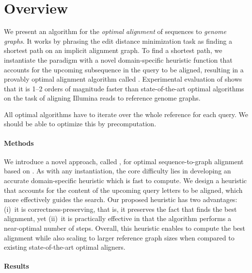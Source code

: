 \section{Overview}

We present an algorithm for the \emph{optimal alignment} of sequences to
\emph{genome graphs}. It works by phrasing the edit distance minimization task
as finding a shortest path on an implicit alignment graph. To find a shortest
path, we instantiate the \A paradigm with a novel domain-specific heuristic
function that accounts for the upcoming subsequence in the query to be aligned,
resulting in a provably optimal alignment algorithm called \astarix.
Experimental evaluation of \astarix shows that it is 1--2 orders of magnitude
faster than state-of-the-art optimal algorithms on the task of aligning Illumina
reads to reference genome graphs.

All optimal algorithms have to iterate over the whole reference for each query.
We should be able to optimize this by precomputation.

\paragraph{Methods}
We introduce a novel approach, called \astarix, for optimal sequence-to-graph
alignment based on \A. As with any \A instantiation, the core difficulty lies in
developing an accurate domain-specific heuristic which is fast to compute. We
design a heuristic that accounts for the content of the upcoming query letters
to be aligned, which more effectively guides the search. Our proposed heuristic
has two advantages: (i)~it is correctness-preserving, that is, it preserves the
fact that \astarix finds the best alignment, yet (ii)~it is practically
effective in that the algorithm performs a near-optimal number of steps.
Overall, this heuristic enables \astarix to compute the best alignment while
also scaling to larger reference graph sizes when compared to existing
state-of-the-art optimal aligners.

\paragraph{Results}

